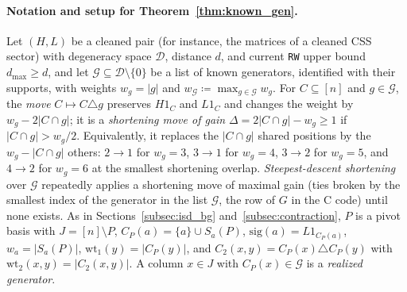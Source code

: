 \documentclass[12pt]{article}
\theoremstyle{definition}
\newcommand{\Dc}{\mathcal{D}}
\newcommand{\Gc}{\mathcal{G}}
\newcommand{\ttt}[1]{\texttt{#1}}
\begin{document}
\paragraph{Notation and setup for Theorem~\ref{thm:known_gen}.}
Let $(H, L)$ be a cleaned pair (for instance, the matrices of a cleaned CSS sector) with degeneracy space $\Dc$,
distance $d$, and current \ttt{RW} upper bound $d_{\max} \ge d$, and let $\Gc \subseteq \Dc \setminus \{0\}$ be a list
of known generators, identified with their supports, with weights $w_g = |g|$ and $w_{\Gc} \coloneqq \max_{g \in \Gc}
w_g$. For $C \subseteq [n]$ and $g \in \Gc$, the \emph{move} $C \mapsto C \triangle g$ preserves $H 1_C$ and $L 1_C$
and changes the weight by $w_g - 2|C \cap g|$; it is a \emph{shortening move of gain} $\Delta = 2|C \cap g| - w_g \ge
1$ if $|C \cap g| > w_g/2$. Equivalently, it replaces the $|C \cap g|$ shared positions by the $w_g - |C \cap g|$
others: $2 \to 1$ for $w_g = 3$, $3 \to 1$ for $w_g = 4$, $3 \to 2$ for $w_g = 5$, and $4 \to 2$ for $w_g = 6$ at the
smallest shortening overlap. \emph{Steepest-descent shortening} over $\Gc$ repeatedly applies a shortening move of
maximal gain (ties broken by the smallest index of the generator in the list $\Gc$, the row of $G$ in the C code)
until none exists. As in Sections~\ref{subsec:isd_bg} and~\ref{subsec:contraction}, $P$ is a pivot
basis with $J = [n] \setminus P$, $C_P(a) = \{a\} \cup S_a(P)$, $\mathrm{sig}(a) = L 1_{C_P(a)}$, $w_a = |S_a(P)|$,
$\mathrm{wt}_1(y) = |C_P(y)|$, and $C_2(x, y) = C_P(x) \triangle C_P(y)$ with $\mathrm{wt}_2(x, y) = |C_2(x, y)|$. A
column $x \in J$ with $C_P(x) \in \Gc$ is a \emph{realized generator}.
\end{document}
